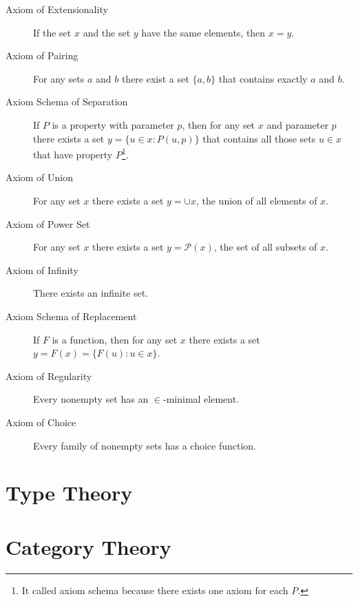 \begin{description}

\item[Axiom of Extensionality] If the set $x$ and the set $y$ have the same elements, then $x=y$.

\item[Axiom of Pairing] For any sets $a$ and $b$ there exist a set $\{a, b\}$ that contains exactly $a$ and $b$.

\item[Axiom Schema of Separation] If $P$ is a property with parameter $p$, then for any set $x$ and parameter $p$ there exists a set $y=\{u \in x : P(u,p) \}$ that contains all those sets $u \in x$ that have property $P$\footnote{It called axiom schema because there exists one axiom for each $P$.}.

\item[Axiom of Union] For any set $x$ there exists a set $y = \cup x$, the union of all elements of $x$. 

\item[Axiom of Power Set] For any set $x$ there exists a set $y = \mathcal{P}(x)$, the set of all subsets of $x$.

\item[Axiom of Infinity] There exists an infinite set.

\item[Axiom Schema of Replacement] If $F$ is a function, then for any set $x$ there exists a set $y = F(x) = \{F(u) : u \in x \}$. 

\item[Axiom of Regularity] Every nonempty set has an $\in$-minimal element.

\item[Axiom of Choice] Every family of nonempty sets has a choice function.

\end{description}





\section{Type Theory}

\section{Category Theory}


